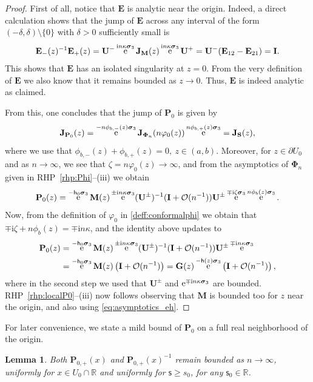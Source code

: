 \documentclass[reqno,a4paper,11pt]{amsart}
\DeclareMathOperator{\ee}{\rm e}
\newcommand{\R}{\mathbb{R}}
\newcommand{\Boh}{\mathcal{O}}
\newcommand{\ii}{\mathrm{i}}
\renewcommand{\bm}{\mathbf}
\newcommand{\msf}{\mathsf}
\renewcommand{\sp}{\boldsymbol \sigma}
\newcommand{\sad}{\msf s}
\newtheorem{lemma}[theorem]{Lemma}
\theoremstyle{definition}
\theoremstyle{remark}
\numberwithin{equation}{section}
\begin{document}
    \begin{proof}
        First of all, notice that $\bm E$ is analytic near the origin. Indeed, a direct calculation shows that the jump of $\bm E$ across any interval of the form $(-\delta,\delta)\setminus \{0\}$ with $\delta>0$ sufficiently small is
%
$$
\bm E_-(z)^{-1}\bm E_+(z)=\bm U^-\ee^{\ii n\kappa\sp_3}\bm J_{\bm M}(z)\ee^{\ii n\kappa\sp_3}\bm U^+=\bm U^-(\bm E_{12}-\bm E_{21})=\bm I.
$$
%
This shows that $\bm E$ has an isolated singularity at $z=0$. From the very definition of $\bm E$ we also know that it remains bounded as $z\to 0$. Thus, $\bm E$ is indeed analytic as claimed.


From this, one concludes that the jump of $\bm P_0$ is given by
%
\[
    \bm J_{\bm P_0}(z) 
        = \ee^{-n\phi_{b,-}(z)\sp_3}\bm J_{\bm\Phi_n}(n\varphi_0(z))\ee^{n\phi_{b,+}(z)\sp_3} = \bm J_{\bm S}(z),
\] 
%
where we use that $\phi_{b,-}(z)+\phi_{b,+}(z)=0,\ z\in(a,b)$.
Moreover, for $z\in\partial U_0$ and as $n\to\infty$, we see that $\zeta=n\varphi_0(z)\to \infty$, and from the asymptotics of $\bm \Phi_n$ given in RHP~\ref{rhp:Phi}--(iii) we obtain
$$
\bm P_0(z)=\ee^{-\msf h_0\sp_3}\bm M(z)\ee^{\pm \ii n\kappa\sp_3}(\bm U^\pm)^{-1}(\bm I+\Boh(n^{-1}))  \bm U^\pm \ee^{\mp \ii \zeta\sp_3}\ee^{n\phi_b(z)\sp_3}.
$$
%
Now, from the definition of $\varphi_0$ in \eqref{deff:conformalphi} we obtain that $\mp \ii \zeta+n\phi_b(z)=\mp \ii n\kappa$, and the identity above updates to
%
\[ \begin{split}
    \bm P_0(z)
        &=\ee^{-\msf h_0\sp_3}\bm M(z)\ee^{\pm \ii n\kappa\sp_3}(\bm U^\pm)^{-1}(\bm I+\Boh(n^{-1}))  \bm U^\pm \ee^{\mp \ii n\kappa\sp_3} \\
        &=\ee^{-\msf h_0\sp_3}\bm M(z) \left(\bm I+\Boh(n^{-1})\right) 
        = \bm G(z) \ee^{- \msf h(z) \sp_3} \left(\bm I+\Boh(n^{-1})\right),
\end{split}
\]
%
where in the second step we used that $\bm U^\pm$ and $\ee^{\mp\ii n\kappa\sp_3}$ are bounded. RHP~\ref{rhp:localP0}--(iii) now follows observing that $\bm M$ is bounded too for $z$ near the origin, and also using \eqref{eq:asymptotics_eh}.
    \end{proof}


For later convenience, we state a mild bound of $\bm P_0$ on a full real neighborhood of the origin.

\begin{lemma} \label{lem:bound_P0}
Both $\bm P_{0,+}(x)$ and $\bm P_{0,+}(x)^{-1}$ remain bounded as $n\to \infty$, uniformly for $x \in U_0 \cap \R$ and uniformly for $\sad\geq s_0$, for any $\sad_0\in \R$.
\end{lemma}
\end{document}
